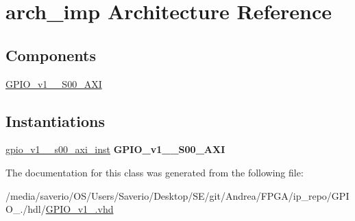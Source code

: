 \hypertarget{classGPIO__v1__0_1_1arch__imp}{}\section{arch\+\_\+imp Architecture Reference}
\label{classGPIO__v1__0_1_1arch__imp}
\subsection*{Components}
 \begin{DoxyCompactItemize}
\item 
\mbox{\label{classGPIO__v1__0_1_1arch__imp_acfa88fcc633c72af8bfd7e652932f7c7}} 
\hyperlink{classGPIO__v1__0_1_1arch__imp_acfa88fcc633c72af8bfd7e652932f7c7}{G\+P\+I\+O\+\_\+v1\+\_\+\_\+\+S00\+\_\+\+A\+XI}  {\bfseries }  
\end{DoxyCompactItemize}
\subsection*{Instantiations}
 \begin{DoxyCompactItemize}
\item 
\mbox{\label{classGPIO__v1__0_1_1arch__imp_add7a292f6a3530426561c0d1bf9540b4}} 
\hyperlink{classGPIO__v1__0_1_1arch__imp_add7a292f6a3530426561c0d1bf9540b4}{gpio\+\_\+v1\+\_\+\_\+s00\+\_\+axi\+\_\+inst}  {\bfseries G\+P\+I\+O\+\_\+v1\+\_\+\_\+\+S00\+\_\+\+A\+XI}   
\end{DoxyCompactItemize}


The documentation for this class was generated from the following file\+:\begin{DoxyCompactItemize}
\item 
/media/saverio/\+O\+S/\+Users/\+Saverio/\+Desktop/\+S\+E/git/\+Andrea/\+F\+P\+G\+A/ip\+\_\+repo/\+G\+P\+I\+O\+\_./hdl/\hyperlink{GPIO__v1__0_8vhd}{G\+P\+I\+O\+\_\+v1\+\_.\+vhd}\end{DoxyCompactItemize}
